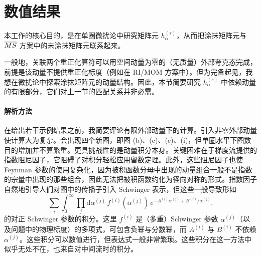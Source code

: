 \section{\label{sec:numres}数值结果}

本工作的核心目的，是在单圈微扰论中研究矩阵元 $h_\alpha^{(s)}$，从而把涂抹矩阵元与 $\overline{MS}$ 方案中的未涂抹矩阵元联系起来。

一般地，关联两个重正化算符可以用空间动量为零的（无质量）外部夸克态完成，前提是该动量不提供重正化标度（例如在 RI/MOM 方案中）。但为完备起见，我想在微扰论中探索涂抹矩阵元的动量结构。因此，本节简要研究 $h_\alpha^{(s)}$ 中依赖动量的有限部分，它们对上一节的匹配关系并非必需。

\paragraph{解析方法}在给出若干示例结果之前，我简要评论有限外部动量下的计算。引入非零外部动量使计算大为复杂。会出现四个新图，即图 (b)、(c)、(e)、(i)，但单圈水平下图数目的增加并不算繁重。更具挑战性的是动量积分本身。关键困难在于梯度流提供的指数阻尼因子，它阻碍了对积分轻松应用留数定理。此外，这些阻尼因子也使 Feynman 参数的使用复杂化，因为被积函数分母中出现的动量组合一般不是指数的宗量中出现的那些组合，因此无法把被积函数约化为径向对称的形式。指数因子自然地引导人们对图中的传播子引入 Schwinger 表示，但这些一般导致形如
\begin{equation}
\sum_i\int_0^\infty \prod_j\mathrm{d}\alpha^{(j)}\,f^{(i)}\left(\alpha^{(j)}\right)\,e^{-A^{(i)}\alpha^{(j)}+B^{(i)}/\alpha^{(j)}}.
\end{equation}
的对正 Schwinger 参数的积分。这里 $f^{(i)}$ 是（多重）Schwinger 参数 $\alpha^{(j)}$（以及问题中的物理标度）的多项式，可包含负幂与分数幂，而 $A^{(i)}$ 与 $B^{(i)}$ 不依赖 $\alpha^{(j)}$。这些积分可以数值进行，但表达式一般非常繁琐。这些积分在这一方法中似乎无处不在，也来自对中间流时的积分。

